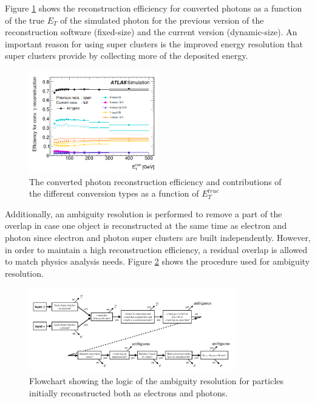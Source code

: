 Figure \ref{fig:chap2:Objects:Egamma:Gamma:Conv:Reco:Eff} shows the reconstruction efficiency for converted photons as a function of the true $E_T$ of the simulated photon for the previous version of the reconstruction software (fixed-size) and the current version (dynamic-size). An important reason for using super clusters is the improved energy resolution that super clusters provide by collecting more of the deposited energy.
\begin{figure}[htbp]
    \centering
    \includegraphics[width=0.5\textwidth]{Ch2/Img/Photon_conv_Reco_Eff.png}
    \caption{The converted photon reconstruction efficiency and contributions of the different conversion types as a function of $E^{true}_T$}
    \label{fig:chap2:Objects:Egamma:Gamma:Conv:Reco:Eff}
\end{figure}

Additionally, an ambiguity resolution is performed to remove a part of the overlap in case one object is reconstructed at the same time as electron and photon since electron and photon super clusters are built independently. However, in order to maintain a high reconstruction efficiency, a residual overlap is allowed to match physics analysis needs. Figure \ref{fig:chap2:Objects:Egamma:Ambg} shows the procedure used for ambiguity resolution. 
\begin{figure}[htbp]
    \centering
    \includegraphics[width=0.8\textwidth]{Ch2/Img/Ambiguity.png}
    \caption{Flowchart showing the logic of the ambiguity resolution for particles initially reconstructed both as electrons and photons.}
    \label{fig:chap2:Objects:Egamma:Ambg}
\end{figure}

